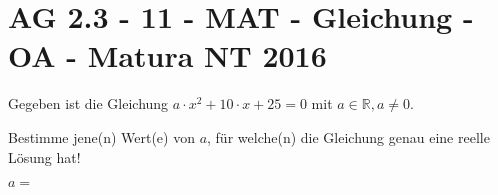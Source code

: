 \section{AG 2.3 - 11 - MAT - Gleichung - OA - Matura NT 2016}

\begin{beispiel}[AG 2.3]{1} %
Gegeben ist die Gleichung $a\cdot x^2+10\cdot x+25=0$ mit $a\in\mathbb{R},a\neq 0$.

Bestimme jene(n) Wert(e) von $a$, für welche(n) die Gleichung genau eine reelle Lösung hat!

$a=$ 
\end{beispiel}